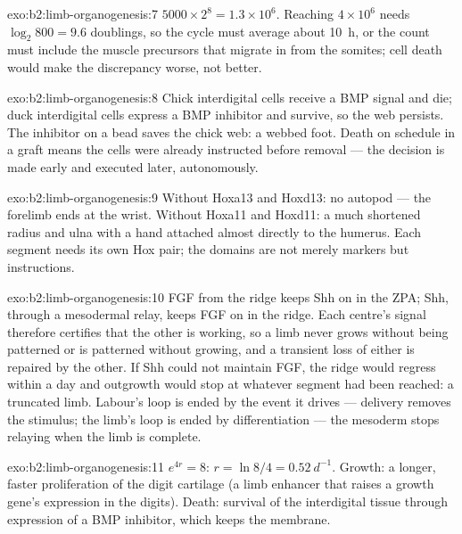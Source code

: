 \begin{solution}{exo:b2:limb-organogenesis:7}
$5000\times 2^{8} = 1.3\times 10^{6}$. Reaching $4\times 10^{6}$ needs
$\log_2 800 = 9.6$ doublings, so the cycle must average about
\qty{10}{h}, or the count must include the muscle precursors that
migrate in from the somites; cell death would make the discrepancy
worse, not better.
\end{solution}

\begin{solution}{exo:b2:limb-organogenesis:8}
Chick interdigital cells receive a BMP signal and die; duck
interdigital cells express a BMP inhibitor and survive, so the web
persists. The inhibitor on a bead saves the chick web: a webbed
foot. Death on schedule in a graft means the cells were already
instructed before removal --- the decision is made early and
executed later, autonomously.
\end{solution}

\begin{solution}{exo:b2:limb-organogenesis:9}
Without Hoxa13 and Hoxd13: no autopod --- the forelimb ends at the
wrist. Without Hoxa11 and Hoxd11: a much shortened radius and ulna
with a hand attached almost directly to the humerus. Each segment
needs its own Hox pair; the domains are not merely markers but
instructions.
\end{solution}

\begin{solution}{exo:b2:limb-organogenesis:10}
FGF from the ridge keeps Shh on in the ZPA; Shh, through a mesodermal
relay, keeps FGF on in the ridge. Each centre's signal therefore
certifies that the other is working, so a limb never grows without
being patterned or is patterned without growing, and a transient
loss of either is repaired by the other. If Shh could not maintain
FGF, the ridge would regress within a day and outgrowth would stop
at whatever segment had been reached: a truncated limb. Labour's
loop is ended by the event it drives --- delivery removes the
stimulus; the limb's loop is ended by differentiation --- the
mesoderm stops relaying when the limb is complete.
\end{solution}

\begin{solution}{exo:b2:limb-organogenesis:11}
$e^{4r} = 8$: $r = \ln 8/4 = \qty{0.52}{d^{-1}}$. Growth: a longer,
faster proliferation of the digit cartilage (a limb enhancer that
raises a growth gene's expression in the digits). Death: survival
of the interdigital tissue through expression of a BMP inhibitor,
which keeps the membrane.
\end{solution}

